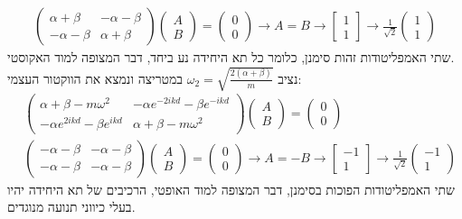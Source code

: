 \documentclass{article}
\begin{document}
\begin{Answer}
\begin{align*}
\begin{pmatrix}
        \alpha+\beta&-\alpha -\beta\\
        -\alpha -\beta &\alpha+\beta
    \end{pmatrix}
    \begin{pmatrix}
        A\\
        B
    \end{pmatrix}=
    \begin{pmatrix}
        0\\
        0
    \end{pmatrix}\rightarrow A=B\rightarrow\begin{bmatrix}1\\1\end{bmatrix}\rightarrow\frac{1}{\sqrt{2}}\begin{pmatrix}
        1\\1
    \end{pmatrix}
\end{align*}שתי האמפליטודות זהות סימנן, כלומר כל תא היחידה נע ביחד, דבר המצופה למוד האקוסטי.\\
נציב $\omega_2=\sqrt{\frac{2\left( \alpha+\beta \right)}{m}}$ במטריצה ונמצא את הווקטור העצמי:
\begin{align*}
    &\begin{pmatrix}
        \alpha+\beta-m\omega^2&-\alpha e^{-2ikd}-\beta e^{-ikd}\\
        -\alpha e^{2ikd}-\beta e^{ikd}&\alpha+\beta-m\omega^2 
    \end{pmatrix}
    \begin{pmatrix}
        A\\
        B
    \end{pmatrix}=
    \begin{pmatrix}
        0\\
        0
    \end{pmatrix}\\
    &\begin{pmatrix}
        -\alpha-\beta&-\alpha -\beta\\
        -\alpha -\beta &-\alpha-\beta
    \end{pmatrix}
    \begin{pmatrix}
        A\\
        B
    \end{pmatrix}=
    \begin{pmatrix}
        0\\
        0
    \end{pmatrix}\rightarrow A=-B\rightarrow\begin{bmatrix}-1\\1\end{bmatrix}\rightarrow\frac{1}{\sqrt{2}}\begin{pmatrix}
        -1\\1
    \end{pmatrix}
\end{align*}
שתי האמפליטודות הפוכות בסימנן, דבר המצופה למוד האופטי, הרכיבים של תא היחידה יהיו בעלי כיווני תנועה מנוגדים.
\end{Answer}
\end{document}
